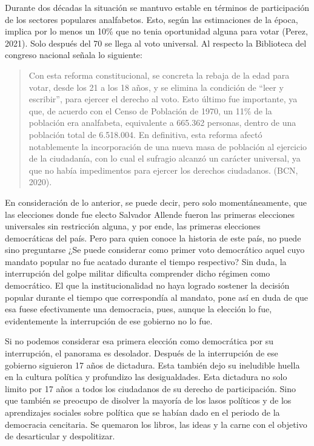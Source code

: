 \documentclass[12pt,twoside]{templates/facsothesis}
\begin{document}
Durante dos décadas la situación se mantuvo estable en términos de participación de los sectores populares analfabetos. Esto, según las estimaciones de la época, implica por lo menos un 10\% que no tenia oportunidad alguna para votar (Perez, 2021). Solo después del 70 se llega al voto universal. Al respecto la Biblioteca del congreso nacional señala lo siguiente:

\begin{quote}
Con esta reforma constitucional, se concreta la rebaja de la edad para votar, desde los 21 a los 18 años, y se elimina la condición de ``leer y escribir'', para ejercer el derecho al voto. Esto último fue importante, ya que, de acuerdo con el Censo de Población de 1970, un 11\% de la población era analfabeta, equivalente a 665.362 personas, dentro de una población total de 6.518.004. En definitiva, esta reforma afectó notablemente la incorporación de una nueva masa de población al ejercicio de la ciudadanía, con lo cual el sufragio alcanzó un carácter universal, ya que no había impedimentos para ejercer los derechos ciudadanos. (BCN, 2020).
\end{quote}

En consideración de lo anterior, se puede decir, pero solo momentáneamente, que las elecciones donde fue electo Salvador Allende fueron las primeras elecciones universales sin restricción alguna, y por ende, las primeras elecciones democráticas del país. Pero para quien conoce la historia de este país, no puede sino preguntarse ¿Se puede considerar como primer voto democrático aquel cuyo mandato popular no fue acatado durante el tiempo respectivo? Sin duda, la interrupción del golpe militar dificulta comprender dicho régimen como democrático. El que la institucionalidad no haya logrado sostener la decisión popular durante el tiempo que correspondía al mandato, pone así en duda de que esa fuese efectivamente una democracia, pues, aunque la elección lo fue, evidentemente la interrupción de ese gobierno no lo fue.

Si no podemos considerar esa primera elección como democrática por su interrupción, el panorama es desolador. Después de la interrupción de ese gobierno siguieron 17 años de dictadura. Esta también dejo su ineludible huella en la cultura política y profundizo las desigualdades. Esta dictadura no solo limito por 17 años a todos los ciudadanos de su derecho de participación. Sino que también se preocupo de disolver la mayoría de los lasos políticos y de los aprendizajes sociales sobre política que se habían dado en el periodo de la democracia cencitaria. Se quemaron los libros, las ideas y la carne con el objetivo de desarticular y despolitizar.
\end{document}
